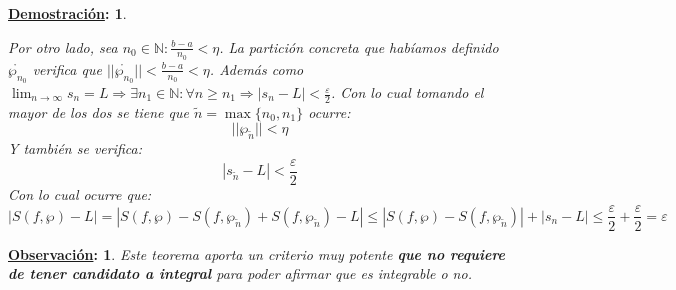 \documentclass[10pt,a4paper,openright]{book}
\theoremstyle{break}
\newtheorem*{demo}{\underline{Demostración}:}
\newtheorem*{obs}{\underline{Observación}:}
\begin{document}
\begin{demo}
\begin{itemize}
Por otro lado, sea $n_0\in \mathbb N: \frac{b-a}{n_0}<\eta$. La partición concreta que habíamos definido $\mathring{\wp_{n_0}}$ verifica que $||\mathring{\wp_{n_0}}||<\frac{b-a}{n_0}<\eta$. Además como $\lim_{n\rightarrow \infty} s_n = L\Rightarrow \exists n_1\in \mathbb N: \forall n \geq n_1 \Rightarrow  |s_n-L|<\frac{\varepsilon}{2}$. Con lo cual tomando el mayor de los dos se tiene que $\tilde{n}=\max\{n_0,n_1\}$ ocurre:
$$||\wp_{\tilde{n}}||<\eta$$
Y también se verifica:
$$|s_{\tilde{n}}-L|<\frac{\varepsilon}{2}$$
Con lo cual ocurre que:
$$|S(f,\wp)-L|=|S(f,\wp)-S(f,\wp_{\tilde{n}})+S(f, \wp_{\tilde{n}})-L|\leq |S(f,\wp )- S(f,\wp_{\tilde{n}})|+|s_n-L|\leq \frac{\varepsilon}{2} + \frac{\varepsilon}{2} = \varepsilon$$
\end{itemize}
\end{demo}

\begin{obs}
Este teorema aporta un criterio muy potente \textbf{que no requiere de tener candidato a integral} para poder afirmar que es integrable o no.
\end{obs}
\end{document}
